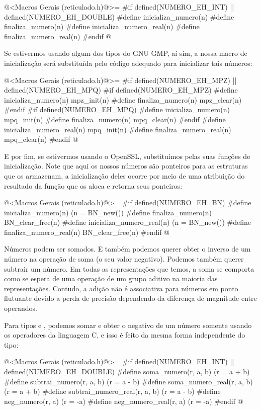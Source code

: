 \iniciocodigo
@<Macros Gerais (reticulado.h)@>=
#if defined(NUMERO_EH_INT) || defined(NUMERO_EH_DOUBLE)
#define inicializa_numero(n)
#define finaliza_numero(n)
#define inicializa_numero_real(n)
#define finaliza_numero_real(n)
#endif
@
\fimcodigo

Se estivermos usando algum dos tipos do GNU GMP, aí sim, a nossa macro
de inicialização será substituída pelo código adequado para
inicializar tais números:

\iniciocodigo
@<Macros Gerais (reticulado.h)@>=
#if defined(NUMERO_EH_MPZ) || defined(NUMERO_EH_MPQ)
#if defined(NUMERO_EH_MPZ)
#define inicializa_numero(n) mpz_init(n)
#define finaliza_numero(n) mpz_clear(n)
#endif
#if defined(NUMERO_EH_MPQ)
#define inicializa_numero(n) mpq_init(n)
#define finaliza_numero(n) mpq_clear(n)
#endif
#define inicializa_numero_real(n) mpq_init(n)
#define finaliza_numero_real(n) mpq_clear(n)
#endif
@
\fimcodigo

E por fim, se estivermos usando o OpenSSL, substituímos pelas suas
funções de inicialização. Note que aqui os nossos números são
ponteiros para as estruturas que os armazenam, a inicialização deles
ocorre por meio de uma atribuição do resultado da função que os aloca
e retorna seus ponteiros:

\iniciocodigo
@<Macros Gerais (reticulado.h)@>=
#if defined(NUMERO_EH_BN)
#define inicializa_numero(n) (n = BN_new())
#define finaliza_numero(n) BN_clear_free(n)
#define inicializa_numero_real(n) (n = BN_new())
#define finaliza_numero_real(n) BN_clear_free(n)
#endif
@
\fimcodigo

Números podem ser somados. E também podemos querer obter o inverso de
um número na operação de soma (o seu valor negativo). Podemos também
querer subtrair um número. Em todas as representações que temos, a
soma se comporta como se espera de uma operação de um grupo aditivo na
maioria das representações. Contudo, a adição não é associativa para
números em ponto flutuante devido a perda de precisão dependendo da
diferença de magnitude entre operandos.

Para tipos  e , podemos somar e
obter o negativo de um número somente usando os operadores da
linguagem C, e isso é feito da mesma forma independente do tipo:

\iniciocodigo
@<Macros Gerais (reticulado.h)@>=
#if defined(NUMERO_EH_INT) || defined(NUMERO_EH_DOUBLE)
#define soma_numero(r, a, b) (r = a + b)
#define subtrai_numero(r, a, b) (r = a - b)
#define soma_numero_real(r, a, b) (r = a + b)
#define subtrai_numero_real(r, a, b) (r = a - b)
#define neg_numero(r, a) (r = -a)
#define neg_numero_real(r, a) (r = -a)
#endif
@
\fimcodigo

